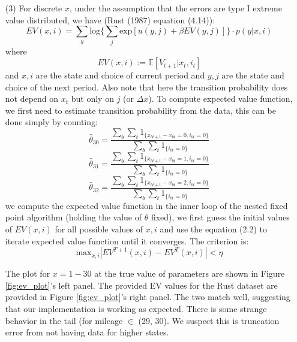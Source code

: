 \documentclass[paper=a4, fontsize=11pt]{scrartcl} %
\numberwithin{equation}{section} %
\numberwithin{figure}{section} %
\numberwithin{table}{section} %
\begin{document}
\begin{itemize}
\begin{itemize}
\item[(3)]
For discrete $x$, under the assumption that the errors are type I extreme value distributed, we have (Rust (1987) equation (4.14)):
\[EV(x,i) = \sum_y \text{log} \{\sum_{j} \text{exp}[u(y,j)+\beta EV(y,j)]\}\cdot p(y|x,i)\tag{2.2}\]
where
\[EV(x,i) := \mathbb{E}[V_{t+1}|x_t,i_t]\]
and $x, i$ are the state and choice of current period and $y,j$ are the state and choice of the next period. Also note that here the transition probability does not depend on $x_t$ but only on $j$ (or $\Delta x$). To compute expected value function, we first need to estimate transition probability from the data, this can be done simply by counting:
\[\hat{\theta}_{30} = \frac{\sum_{b}\sum_{t} 1_{\{x_{bt+1}-x_{bt}=0, i_{bt}=0\}}}{\sum_{b}\sum_{t} 1_{\{i_{bt}=0\}}}\]
\[\hat{\theta}_{31} = \frac{\sum_{b}\sum_{t} 1_{\{x_{bt+1}-x_{bt}=1, i_{bt}=0\}}}{\sum_{b}\sum_{t} 1_{\{i_{bt}=0\}}}\]
\[\hat{\theta}_{32} = \frac{\sum_{b}\sum_{t} 1_{\{x_{bt+1}-x_{bt}=2, i_{bt}=0\}}}{\sum_{b}\sum_{t} 1_{\{i_{bt}=0\}}}\]
we compute the expected value function in the inner loop of the nested fixed point algorithm (holding the value of $\theta$ fixed), we first guess the initial values of $EV(x,i)$ for all possible values of $x,i$ and use the equation (2.2) to iterate expected value function until it converges. The criterion is:
\[\text{max}_{x,i}|EV^{T+1}(x,i)-EV^T(x,i)|<\eta\]

The plot for $x=1-30$ at the true value of parameters are shown in Figure \ref{fig:ev_plot}'s left panel. The provided EV values for the Rust dataset are provided in Figure \ref{fig:ev_plot}'s right panel. The two match well, suggesting that our implementation is working as expected. There is some strange behavior in the tail (for mileage $\in$ (29, 30). We suspect this is truncation error from not having data for higher states.


\end{itemize}
\end{itemize}
\end{document}
